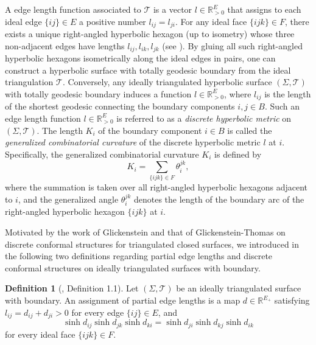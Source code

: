\documentclass[12pt]{amsart}
\theoremstyle{definition}
\newtheorem{definition}[theorem]{Definition}
\begin{document}
A edge length function associated to $\mathcal{T}$ is a vector $l \in \mathbb{R}^E_{>0}$ that assigns to each ideal edge $\{ij\} \in E$ a positive number $l_{ij} = l_{ji}$. 
For any ideal face $\{ijk\} \in F$, there exists a unique right-angled hyperbolic hexagon (up to isometry) whose three non-adjacent edges have lengths $l_{ij}, l_{ik}, l_{jk}$ (see \cite[Theorem 3.5.14]{Ratcliffe}). 
By gluing all such right-angled hyperbolic hexagons isometrically along the ideal edges in pairs,
one can construct a hyperbolic surface with totally geodesic boundary from the ideal triangulation $\mathcal{T}$. 
Conversely, any ideally triangulated hyperbolic surface $(\Sigma, \mathcal{T})$ with totally geodesic boundary induces a function $l \in \mathbb{R}^E_{>0}$, where $l_{ij}$ is the length of the shortest geodesic connecting the boundary components $i, j \in B$. Such an edge length function $l \in \mathbb{R}^E_{>0}$ is referred to as a \textit{discrete hyperbolic metric} on $(\Sigma, \mathcal{T})$.
The length $K_i$ of the boundary component $i \in B$ is called the \textit{generalized combinatorial curvature} of the discrete hyperbolic metric $l$ at $i$. Specifically, the generalized combinatorial curvature $K_i$ is defined by
\begin{equation}\label{Eq: K}
K_i = \sum_{\{ijk\} \in F} \theta^{jk}_i,
\end{equation}
where the summation is taken over all right-angled hyperbolic hexagons adjacent to $i$, and the generalized angle $\theta^{jk}_i$ denotes the length of the boundary arc of the right-angled hyperbolic hexagon $\{ijk\}$ at $i$.

Motivated by the work of Glickenstein \cite{Glickenstein} and that of Glickenstein-Thomas \cite{GT} on discrete conformal structures for triangulated closed surfaces, 
we introduced in \cite{X-Z DCS1} the following two definitions regarding partial edge lengths and discrete conformal structures on ideally triangulated surfaces with boundary.

\begin{definition}[\cite{X-Z DCS1}, Definition 1.1]\label{Def: partial edge length}
Let $(\Sigma,\mathcal{T})$ be an ideally triangulated surface with boundary.
An assignment of partial edge lengths is a map $d\in \mathbb{R}^{E_{+}}$ satisfying $l_{ij}=d_{ij}+d_{ji}>0$ for every edge $\{ij\}\in E$, and
\begin{equation}\label{Eq: compatible condition}
\sinh d_{ij} \sinh d_{jk} \sinh d_{ki}=
\sinh d_{ji} \sinh d_{kj} \sinh d_{ik}
\end{equation}
for every ideal face $\{ijk\}\in F$.
\end{definition}
\end{document}
